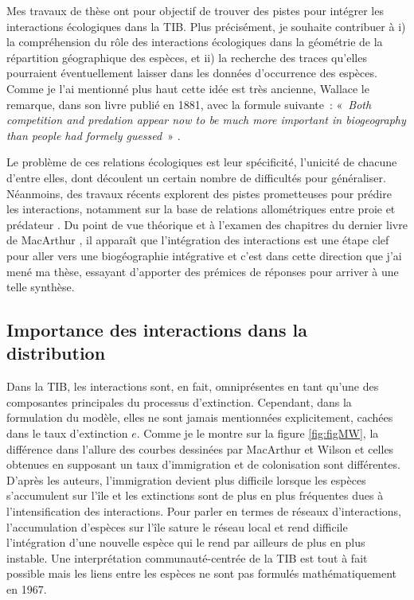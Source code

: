 Mes travaux de thèse ont pour objectif de trouver des pistes pour
intégrer les interactions écologiques dans la TIB. Plus précisément, je
souhaite contribuer à i) la compréhension du rôle des interactions
écologiques dans la géométrie de la répartition géographique des
espèces, et ii) la recherche des traces qu'elles pourraient
éventuellement laisser dans les données d'occurrence des espèces. Comme
je l'ai mentionné plus haut cette idée est très ancienne, Wallace le
remarque, dans son livre publié en 1881, avec la formule suivante~:
«~\emph{Both competition and predation appear now to be much more
important in biogeography than people had formely guessed}~» \citep[
p.28]{wallace1881island}.

Le problème de ces relations écologiques est leur spécificité, l'unicité
de chacune d'entre elles, dont découlent un certain nombre de
difficultés pour généraliser. Néanmoins, des travaux récents explorent
des pistes prometteuses pour prédire les interactions, notamment sur la
base de relations allométriques entre proie et prédateur
\citep{Gravel2013}. Du point de vue théorique et à l'examen des
chapitres du dernier livre de MacArthur
\citep{macarthur1972geographical}, il apparaît que l'intégration des
interactions est une étape clef pour aller vers une biogéographie
intégrative et c'est dans cette direction que j'ai mené ma thèse,
essayant d'apporter des prémices de réponses pour arriver à une telle
synthèse.

\subsection*{Importance des interactions dans la
distribution}\label{importance-des-interactions-dans-la-distribution}

Dans la TIB, les interactions sont, en fait, omniprésentes en tant
qu'une des composantes principales du processus d'extinction. Cependant,
dans la formulation du modèle, elles ne sont jamais mentionnées
explicitement, cachées dans le taux d'extinction \(e\). Comme je le
montre sur la figure \ref{fig:figMW}, la différence dans l'allure des
courbes dessinées par MacArthur et Wilson et celles obtenues en
supposant un taux d'immigration et de colonisation sont différentes.
D'après les auteurs, l'immigration devient plus difficile lorsque les
espèces s'accumulent sur l'île et les extinctions sont de plus en plus
fréquentes dues à l'intensification des interactions. Pour parler en
termes de réseaux d'interactions, l'accumulation d'espèces sur l'île
sature le réseau local et rend difficile l'intégration d'une nouvelle
espèce qui le rend par ailleurs de plus en plus instable. Une
interprétation communauté-centrée de la TIB est tout à fait possible
mais les liens entre les espèces ne sont pas formulés mathématiquement
en 1967.

